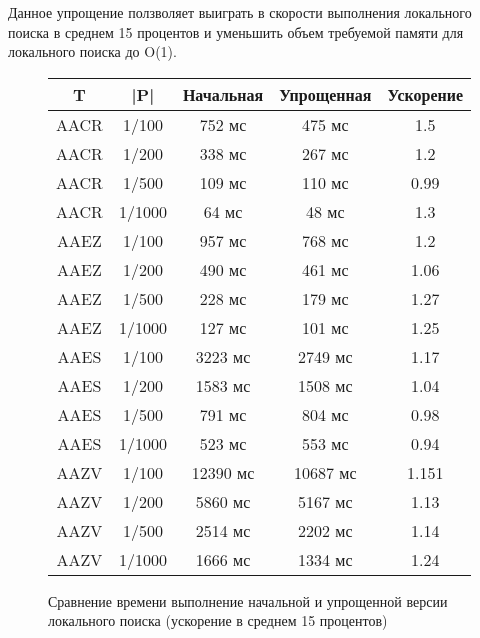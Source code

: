 \documentclass[14pt]{article}
\begin{document}
Данное упрощение ползволяет выиграть в скорости выполнения локального поиска в среднем 15 процентов и уменьшить объем требуемой памяти для локального поиска до O(1).

\begin{figure}
	\begin{center}
    \begin{tabular}{ | c | c | c | c | c |}
        \hline T & |P| & Начальная & Упрощенная & Ускорение\\
        \hline AACR & 1/100 & 752 мс & 475  мс & 1.5 \\
        \hline AACR & 1/200 & 338 мс & 267  мс & 1.2\\
        \hline AACR & 1/500 & 109 мс & 110  мс & 0.99\\
        \hline AACR & 1/1000 & 64 мс & 48 мс & 1.3\\
        \hline AAEZ & 1/100 & 957 мс & 768  мс & 1.2 \\
        \hline AAEZ & 1/200 & 490 мс & 461  мс & 1.06 \\
        \hline AAEZ & 1/500 & 228 мс & 179  мс & 1.27	\\
        \hline AAEZ & 1/1000 & 127 мс & 101 мс & 1.25\\
        \hline AAES & 1/100 & 3223 мс & 2749  мс & 1.17\\
        \hline AAES & 1/200 & 1583 мс & 1508 мс & 1.04\\
        \hline AAES & 1/500 & 791 мс & 804  мс & 0.98\\
        \hline AAES & 1/1000 & 523 мс & 553  мс & 0.94 \\
        \hline AAZV & 1/100 & 12390 мс & 10687  мс & 1.151\\
        \hline AAZV & 1/200 & 5860 мс & 5167  мс & 1.13\\
        \hline AAZV & 1/500 & 2514 мс & 2202   мс & 1.14\\
        \hline AAZV & 1/1000 & 1666 мс & 1334  мс & 1.24 \\
\hline
    \end{tabular}
    \end{center}
    \caption{Сравнение времени выполнение начальной и упрощенной версии локального поиска (ускорение в среднем 15 процентов)}
    \label{typical_research}
\end{figure}
\end{document}
